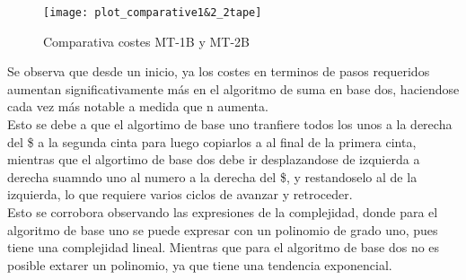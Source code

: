 \begin{figure}[h]
    \centering
    \texttt{[image: plot\_comparative1\&2\_2tape]}
    \caption{Comparativa costes MT-1B y MT-2B}
\end{figure}

Se observa que desde un inicio, ya los costes en terminos de pasos requeridos aumentan significativamente más en el algoritmo de suma en base dos, haciendose cada vez más notable a medida que n aumenta.\\ Esto se debe a que el algortimo de base uno tranfiere todos los unos a la derecha del \$ a la segunda cinta para luego copiarlos a al final de la primera cinta, mientras que el algortimo de base dos debe ir desplazandose de izquierda a derecha suamndo uno al numero a la derecha del \$, y restandoselo al de la izquierda, lo que requiere varios ciclos de avanzar y retroceder.\\
Esto se corrobora observando las expresiones de la complejidad, donde para el algoritmo de base uno se puede expresar con un polinomio de grado uno, pues tiene una complejidad lineal. Mientras que para el algoritmo de base dos no es posible extarer un polinomio, ya que tiene una tendencia exponencial.
